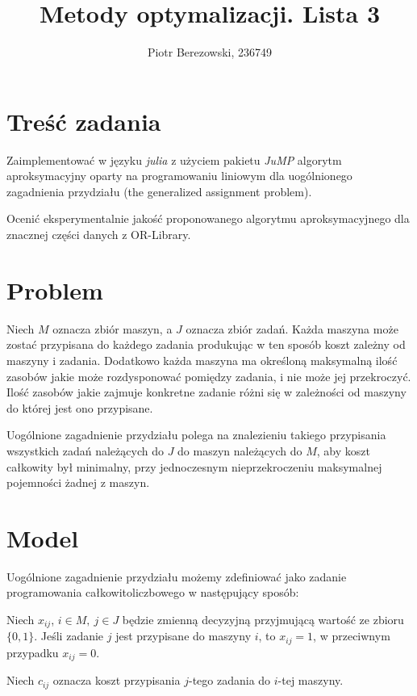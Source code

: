 \documentclass{article}
\title{Metody optymalizacji. Lista 3}
\author{Piotr Berezowski, 236749}
\begin{document}
	\maketitle
	\newpage
	
	\section{Treść zadania}

    Zaimplementować w języku \textit{julia} z użyciem pakietu \textit{JuMP} algorytm aproksymacyjny oparty na programowaniu liniowym dla 
    uogólnionego zagadnienia przydziału (the generalized assignment problem). 
    
    Ocenić eksperymentalnie jakość proponowanego algorytmu aproksymacyjnego dla znacznej części danych z OR-Library.
    
    \section{Problem}

    Niech $M$ oznacza zbiór maszyn, a $J$ oznacza zbiór zadań. Każda maszyna może zostać przypisana do każdego zadania produkując w ten sposób 
    koszt zależny od maszyny i zadania. Dodatkowo każda maszyna ma określoną maksymalną ilość zasobów jakie może rozdysponować pomiędzy zadania, 
    i nie może jej przekroczyć. Ilość zasobów jakie zajmuje konkretne zadanie różni się w zależności od maszyny do której jest ono przypisane. 

    Uogólnione zagadnienie przydziału polega na znalezieniu takiego przypisania wszystkich zadań należących do $J$ do maszyn należących 
    do $M$, aby koszt całkowity był minimalny, przy jednoczesnym nieprzekroczeniu maksymalnej pojemności żadnej z maszyn. 
    
    \section{Model}

    Uogólnione zagadnienie przydziału możemy zdefiniować jako zadanie programowania całkowitoliczbowego w następujący sposób:

    Niech $x_{ij}$, $i \in M,\ j \in J$ będzie zmienną decyzyjną przyjmującą wartość ze zbioru $\{0, 1\}$. Jeśli zadanie $j$ jest 
    przypisane do maszyny $i$, to $x_{ij} = 1$, w przeciwnym przypadku $x_{ij} = 0$.

    Niech $c_{ij}$ oznacza koszt przypisania $j$-tego zadania do $i$-tej maszyny.
\end{document}
